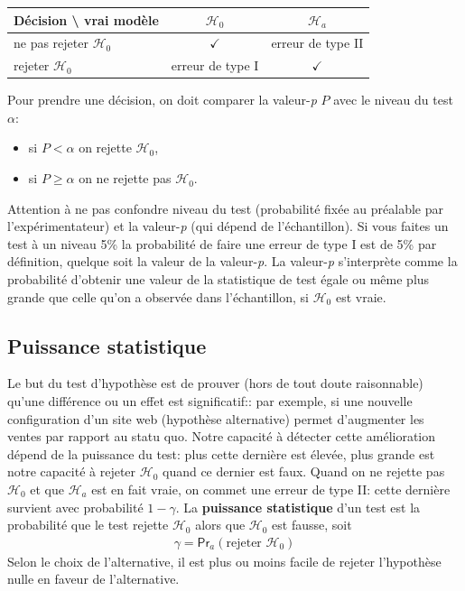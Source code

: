 \documentclass[
  11pt,
  letterpaper,
]{book}
\providecommand{\tightlist}{%
  \setlength{\itemsep}{0pt}\setlength{\parskip}{0pt}}
\theoremstyle{definition}
\theoremstyle{definition}
\theoremstyle{definition}
\theoremstyle{remark}
\begin{document}
\begin{longtable}[]{@{}lcc@{}}
\toprule
\textbf{Décision} \textbackslash{} \textbf{vrai modèle} & \(\mathscr{H}_0\) & \(\mathscr{H}_a\)\tabularnewline
\midrule
\endhead
ne pas rejeter \(\mathscr{H}_0\) & \(\checkmark\) & erreur de type II\tabularnewline
rejeter \(\mathscr{H}_0\) & erreur de type I & \(\checkmark\)\tabularnewline
\bottomrule
\end{longtable}

Pour prendre une décision, on doit comparer la valeur-\emph{p} \(P\) avec le niveau du test \(\alpha\):

\begin{itemize}
\tightlist
\item
  si \(P < \alpha\) on rejette \(\mathscr{H}_0\),
\item
  si \(P \geq \alpha\) on ne rejette pas \(\mathscr{H}_0\).
\end{itemize}

Attention à ne pas confondre niveau du test (probabilité fixée au préalable par l'expérimentateur) et la valeur-\emph{p} (qui dépend de l'échantillon). Si vous faites un test à un niveau 5\% la
probabilité de faire une erreur de type I est de 5\% par définition, quelque soit la
valeur de la valeur-\emph{p}. La valeur-\emph{p} s'interprète comme la probabilité d'obtenir une valeur de
la statistique de test égale ou même plus grande que celle qu'on a observée dans l'échantillon, si \(\mathscr{H}_0\) est vraie.

\hypertarget{puissance-statistique}{%
\subsection{Puissance statistique}\label{puissance-statistique}}

Le but du test d'hypothèse est de prouver (hors de tout doute raisonnable) qu'une différence ou un effet est significatif:: par exemple, si une nouvelle configuration d'un site web (hypothèse alternative) permet d'augmenter les ventes par rapport au statu quo. Notre capacité à détecter cette amélioration dépend de la puissance du test: plus cette dernière est élevée, plus grande est notre capacité à rejeter \(\mathscr{H}_0\) quand ce dernier est faux.
Quand on ne rejette pas \(\mathscr{H}_0\) et que \(\mathscr{H}_a\) est en fait vraie, on commet une erreur de type II: cette dernière survient avec probabilité \(1-\gamma\). La \textbf{puissance statistique} d'un test est la probabilité que le test rejette \(\mathscr{H}_0\) alors que \(\mathscr{H}_0\) est fausse, soit
\begin{align*}
\gamma = \mathsf{Pr}_a(\text{rejeter } \mathscr{H}_0)
\end{align*}
Selon le choix de l'alternative, il est plus ou moins facile de rejeter l'hypothèse nulle en faveur de l'alternative.
\end{document}
